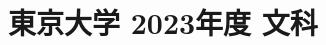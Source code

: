 ﻿\documentclass[../../uem_mat_tok_q.tex]{subfiles}
\begin{document}
    \section{東京大学 2023年度 文科}
    \subsection{　}
    
    \vfill
    \subsection{　}
    
    \vfill
    \newpage
    \subsection{　}
    
    \vfill
    \subsection{　}
    
    \vfill
\end{document}
